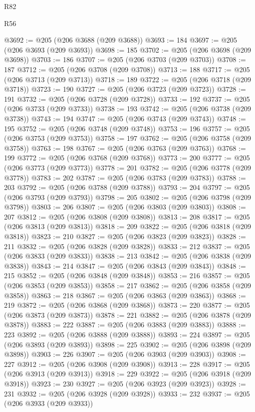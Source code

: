 \begin{lexlean}{R82}
\begin{lexlean}{R56}
\begin{coremodule}
{{{{{{{{{{{{{{{{{{{{{{{{{{{{{{{{{{{{{{{{{{{{{{{{{{{{{{{{{{{{{{{{{{{{{{{{{{{{{{{{{{{{{{{{{{{{{{{{{{{{{{{{{{{{{{{{{{{{{{{{{{{{{{{{{{{{{{{{{{{{{{{{{{{{{{{{{{{{{{{{{{{{{{{{{{{{{{{{{{{{{{{{{{{{{{{{{{{{{{{{{{{{{{{{{{{@3692 := @205 (@206 @3688 (@209 @3688))
@3693 := 184
@3697 := @205 (@206 @3693 (@209 @3693))
@3698 := 185
@3702 := @205 (@206 @3698 (@209 @3698))
@3703 := 186
@3707 := @205 (@206 @3703 (@209 @3703))
@3708 := 187
@3712 := @205 (@206 @3708 (@209 @3708))
@3713 := 188
@3717 := @205 (@206 @3713 (@209 @3713))
@3718 := 189
@3722 := @205 (@206 @3718 (@209 @3718))
@3723 := 190
@3727 := @205 (@206 @3723 (@209 @3723))
@3728 := 191
@3732 := @205 (@206 @3728 (@209 @3728))
@3733 := 192
@3737 := @205 (@206 @3733 (@209 @3733))
@3738 := 193
@3742 := @205 (@206 @3738 (@209 @3738))
@3743 := 194
@3747 := @205 (@206 @3743 (@209 @3743))
@3748 := 195
@3752 := @205 (@206 @3748 (@209 @3748))
@3753 := 196
@3757 := @205 (@206 @3753 (@209 @3753))
@3758 := 197
@3762 := @205 (@206 @3758 (@209 @3758))
@3763 := 198
@3767 := @205 (@206 @3763 (@209 @3763))
@3768 := 199
@3772 := @205 (@206 @3768 (@209 @3768))
@3773 := 200
@3777 := @205 (@206 @3773 (@209 @3773))
@3778 := 201
@3782 := @205 (@206 @3778 (@209 @3778))
@3783 := 202
@3787 := @205 (@206 @3783 (@209 @3783))
@3788 := 203
@3792 := @205 (@206 @3788 (@209 @3788))
@3793 := 204
@3797 := @205 (@206 @3793 (@209 @3793))
@3798 := 205
@3802 := @205 (@206 @3798 (@209 @3798))
@3803 := 206
@3807 := @205 (@206 @3803 (@209 @3803))
@3808 := 207
@3812 := @205 (@206 @3808 (@209 @3808))
@3813 := 208
@3817 := @205 (@206 @3813 (@209 @3813))
@3818 := 209
@3822 := @205 (@206 @3818 (@209 @3818))
@3823 := 210
@3827 := @205 (@206 @3823 (@209 @3823))
@3828 := 211
@3832 := @205 (@206 @3828 (@209 @3828))
@3833 := 212
@3837 := @205 (@206 @3833 (@209 @3833))
@3838 := 213
@3842 := @205 (@206 @3838 (@209 @3838))
@3843 := 214
@3847 := @205 (@206 @3843 (@209 @3843))
@3848 := 215
@3852 := @205 (@206 @3848 (@209 @3848))
@3853 := 216
@3857 := @205 (@206 @3853 (@209 @3853))
@3858 := 217
@3862 := @205 (@206 @3858 (@209 @3858))
@3863 := 218
@3867 := @205 (@206 @3863 (@209 @3863))
@3868 := 219
@3872 := @205 (@206 @3868 (@209 @3868))
@3873 := 220
@3877 := @205 (@206 @3873 (@209 @3873))
@3878 := 221
@3882 := @205 (@206 @3878 (@209 @3878))
@3883 := 222
@3887 := @205 (@206 @3883 (@209 @3883))
@3888 := 223
@3892 := @205 (@206 @3888 (@209 @3888))
@3893 := 224
@3897 := @205 (@206 @3893 (@209 @3893))
@3898 := 225
@3902 := @205 (@206 @3898 (@209 @3898))
@3903 := 226
@3907 := @205 (@206 @3903 (@209 @3903))
@3908 := 227
@3912 := @205 (@206 @3908 (@209 @3908))
@3913 := 228
@3917 := @205 (@206 @3913 (@209 @3913))
@3918 := 229
@3922 := @205 (@206 @3918 (@209 @3918))
@3923 := 230
@3927 := @205 (@206 @3923 (@209 @3923))
@3928 := 231
@3932 := @205 (@206 @3928 (@209 @3928))
@3933 := 232
@3937 := @205 (@206 @3933 (@209 @3933))
}}}}}}}}}}}}}}}}}}}}}}}}}}}}}}}}}}}}}}}}}}}}}}}}}}}}}}}}}}}}}}}}}}}}}}}}}}}}}}}}}}}}}}}}}}}}}}}}}}}}}}}}}}}}}}}}}}}}}}}}}}}}}}}}}}}}}}}}}}}}}}}}}}}}}}}}}}}}}}}}}}}}}}}}}}}}}}}}}}}}}}}}}}}}}}}}}}}}}}}}}}}}}}}}}}}
\end{coremodule}
\end{lexlean}
\end{lexlean}
